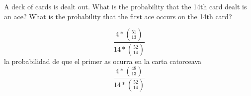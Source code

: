 \item A deck of cards is dealt out. What is the probability that the 14th card dealt is an ace? What is the probability that the first ace occurs on the 14th card?

\[ \frac{4 * \binom{51}{13}}{14 * \binom{52}{14}} \]
la probabilidad de que el primer as ocurra en la carta catorceava
\[ \frac{4 * \binom{48}{13}}{14 * \binom{52}{14}} \]
